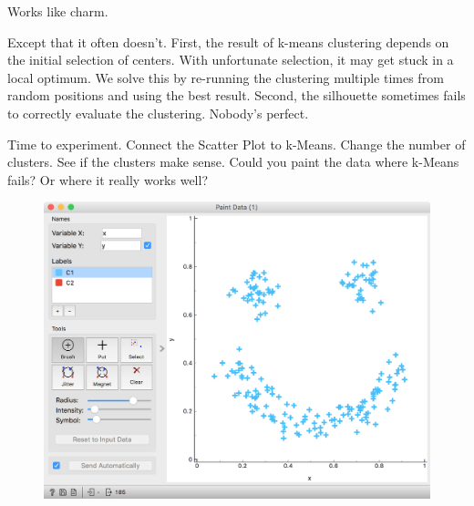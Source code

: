 \newpage

Works like charm.

Except that it often doesn't. First, the result of k-means clustering depends on the initial selection of centers. With unfortunate selection, it may get stuck in a local optimum. We solve this by re-running the clustering multiple times from random positions and using the best result. Second, the silhouette sometimes fails to correctly evaluate the clustering. Nobody's perfect.

Time to experiment. Connect the Scatter Plot to k-Means. Change the number of clusters. See if the clusters make sense. Could you paint the data where k-Means fails? Or where it really works well?

\begin{figure}[h]
    \centering
    \includegraphics[width=\linewidth]{smiley-face.png}
    \caption{$\;$} %
\end{figure}
